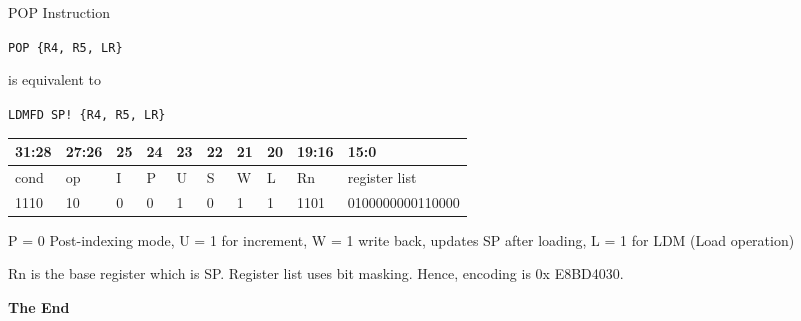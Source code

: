 \documentclass[aspectratio=169]{beamer}
\begin{document}
\begin{frame}{POP Instruction}

    \begin{tcolorbox}[
        enhanced,
        colback=androidBlueLight,
        colframe=androidBlue,
        arc=5pt,
        boxrule=1pt,
        title=\textbf{},
        fonttitle=\bfseries,
        coltitle=black,
        top=10pt,
        bottom=8pt,
        left=8pt,
        right=8pt,
        attach boxed title to top left={xshift=10pt, yshift=-\tcboxedtitleheight/2},
        boxed title style={
            colback=androidBlue,    
            colframe=androidBlue,
            arc=3pt,
            boxrule=0pt,
            left=6pt, right=6pt,
            top=3pt, bottom=3pt
        }
        ]
        
        
        \texttt{POP \{R4, R5, LR\} }

        \vspace{0.5em}

        is equivalent to 

        \vspace{0.5em}

        \texttt{LDMFD SP!  \{R4, R5, LR\} }

    \end{tcolorbox}

    \footnotesize
    \renewcommand{\arraystretch}{1.2}
    \begin{tabular}{|p{3.0em}|p{3.0em}|p{1.5em}|p{1.5em}|p{1.5em}|p{1.5em}|p{1.5em}|p{1.5em}|p{3.0em}|p{10.0em}|}
    \hline
    31:28 & 27:26 & 25 & 24 & 23 & 22 & 21 & 20 & 19:16 & 15:0\\
    \hline
    cond & op & I & P & U & S & W & L & Rn & register list\\
    \hline
    1110 & 10 & 0 & 0 & 1 & 0 & 1 & 1 & 1101 & 0100000000110000 \\
    \hline
    \end{tabular}

    \vspace{0.5em}


    P = 0 Post-indexing mode, U = 1 for increment, W = 1 write back, updates SP after loading, L = 1 for LDM (Load operation)

    Rn is the base register which is SP. Register list uses bit masking. Hence, encoding is 0x E8BD4030.

    
\end{frame}





    \begin{frame}
        \Huge{\centerline{\color{androidGreen}\textbf{The End}}}
    \end{frame}
    
    
\end{document}
